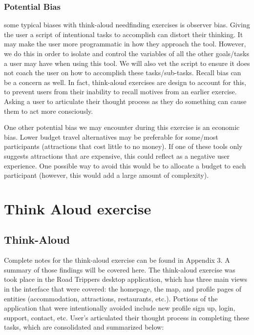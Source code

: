 \subsubsection{Potential Bias} some typical biases with think-aloud needfinding exercises is observer bias. Giving the user a script of intentional tasks to accomplish can distort their thinking. It may make the user more programmatic in how they approach the tool. However, we do this in order to isolate and control the variables of all the other goals/tasks a user may have when using this tool. We will also vet the script to ensure it does not coach the user on how to accomplish these tasks/sub-tasks. Recall bias can be a concern as well. In fact, think-aloud exercises are design to account for this, to prevent users from their inability to recall motives from an earlier exercise. Asking a user to articulate their thought process as they do something can cause them to act more consciously.

One other potential bias we may encounter during this exercise is an economic bias. Lower budget travel alternatives may be preferable for some/most participants (attractions that cost little to no money). If one of these tools only suggests attractions that are expensive, this could reflect as a negative user experience. One possible way to avoid this would be to allocate a budget to each participant (however, this would add a large amount of complexity).

\section{Think Aloud exercise}
\subsection{Think-Aloud}
Complete notes for the think-aloud exercise can be found in Appendix 3. A summary of those findings will be covered here. The think-aloud exercise was took place in the Road Trippers desktop application, which has three main views in the interface that were covered: the homepage, the map, and profile pages of entities (accommodation, attractions, restaurants, etc.). Portions of the application that were intentionally avoided include new profile sign up, login, support, contact, etc. User's articulated their thought process in completing these tasks, which are consolidated and summarized below:

